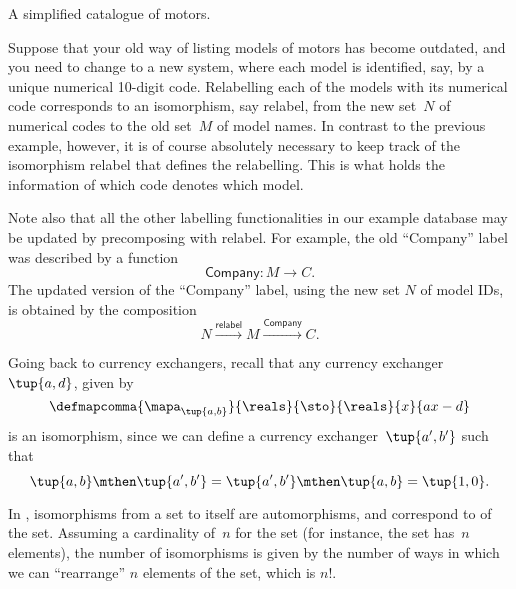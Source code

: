 \begin{example}[Relabelling]
\begin{table*}[h]
        \caption{
            A simplified catalogue of motors.
        }
        \label{tab:electric_motors}
    \end{table*}
    Suppose that your old way of listing models of motors has become outdated, and you need to change to a new system, where each model is identified, say, by a unique numerical 10-digit code.
    Relabelling each of the models with its numerical code corresponds to an isomorphism, say \textsf{relabel}, from the new set~$N$ of numerical codes to the old set~$M$ of model names.
    In contrast to the previous example, however, it is of course absolutely necessary to keep track of the isomorphism \textsf{relabel} that defines the relabelling.
    This is what holds the information of which code denotes which model.

    Note also that all the other labelling functionalities in our example database may be updated by precomposing with \textsf{relabel}.
    For example, the old ``Company'' label was described by a function
    \begin{equation}
        \textsf{Company}\colon M \to C.
    \end{equation}
    The updated version of the ``Company'' label, using the new set $N$ of model IDs, is obtained by the composition
    \begin{equation}
        N \overset{\textsf{relabel}}{\longrightarrow} M \overset{\textsf{Company}}{\longrightarrow} C.
    \end{equation}
\end{example}

\begin{example}
    Going back to currency exchangers, recall that any currency exchanger~$\tup{a,d}$, given by
    \begin{equation}
        \defmapcomma{
            \mapa_{\tup{a,b}}
        }{
            \reals
        }{
            \sto
        }{
            \reals
        }{
            x
        }{
            ax-d
        }
    \end{equation}
    is an isomorphism, since we can define a currency exchanger~$\tup{a',b'}$ such that
    \begin{equation}
        \tup{a,b}\mthen \tup{a',b'}=\tup{a',b'}\mthen \tup{a,b}=\tup{1,0}.
    \end{equation}
\end{example}

\begin{example}
    In \FinSet, isomorphisms from a set to itself are automorphisms, and correspond to  of the set.
    Assuming a cardinality of~$n$ for the set (for instance, the set has~$n$ elements), the number of isomorphisms is given by the number of ways in which we can ``rearrange'' $n$ elements of the set, which is $n!
    $.
\end{example}

